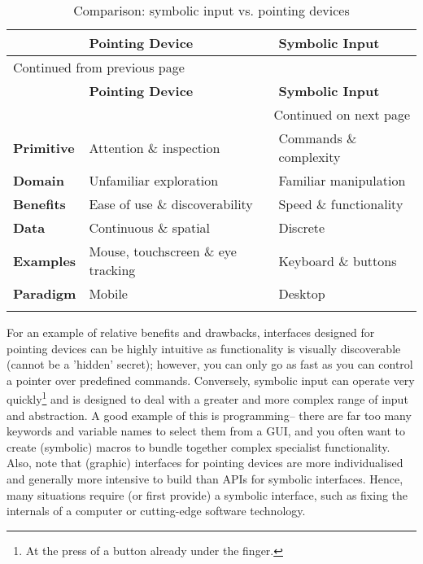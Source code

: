 \documentclass[logo,bsc,singlespacing,parskip]{infthesis}
\begin{document}
{\small %
{\renewcommand{\arraystretch}{1.2} %
\begin{longtable}{|p{2.0cm}|p{4.4cm}|p{4.4cm}|}
\hline
 & \textbf{Pointing Device} & \textbf{Symbolic Input}\\
\hline
\endfirsthead
\multicolumn{3}{l}{Continued from previous page} \\
\hline

 & \textbf{Pointing Device} & \textbf{Symbolic Input} \\

\hline
\endhead
\hline\multicolumn{3}{r}{Continued on next page} \\
\endfoot
\endlastfoot
\hline
\textbf{Primitive} & Attention \& inspection & Commands \& complexity\\
\hline
\textbf{Domain} & Unfamiliar exploration & Familiar manipulation\\
\hline
\textbf{Benefits} & Ease of use \& discoverability & Speed \& functionality\\
\hline
\textbf{Data} & Continuous \& spatial & Discrete\\
\hline
\textbf{Examples} & Mouse, touchscreen \& eye tracking & Keyboard \& buttons\\
\hline
\textbf{Paradigm} & Mobile & Desktop\\
\hline
\caption{\label{tab:pdsi}Comparison: symbolic input vs. pointing devices}
\\
\end{longtable}
}
}

For an example of relative benefits and drawbacks, interfaces designed for pointing devices can be highly intuitive as functionality is visually discoverable (cannot be a 'hidden' secret); however, you can only go as fast as you can control a pointer over predefined commands.
Conversely, symbolic input can operate very quickly\footnote{At the press of a button already under the finger.} and is designed to deal with a greater and more complex range of input and abstraction.
A good example of this is programming-- there are far too many keywords and variable names to select them from a GUI, and you often want to create (symbolic) macros to bundle together complex specialist functionality.
Also, note that (graphic) interfaces for pointing devices are more individualised and generally more intensive to build than APIs for symbolic interfaces.
Hence, many situations require (or first provide) a symbolic interface, such as fixing the internals of a computer or cutting-edge software technology.
\end{document}
